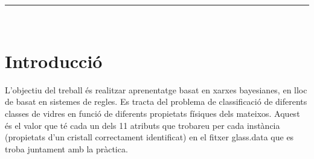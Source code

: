 \documentclass[11pt,a4paper]{article}
\begin{document}
\begin{titlepage}
\begin{center}
\vspace*{0.2in}
\begin{center}
\rule{120mm}{0.1mm}\\
\end{center}
\end{center}
\vspace*{0.2in}
\part*{Introducció}
L'objectiu del treball és realitzar aprenentatge basat en xarxes bayesianes, en lloc de basat en sistemes
de regles. Es tracta del problema de classificació de diferents classes de vidres en funció de diferents
propietats físiques dels mateixos. Aquest és el valor que té cada un dels 11 atributs que trobareu
per cada instància (propietats d'un cristall correctament identificat) en el fitxer glass.data que es troba juntament amb la pràctica.
\end{titlepage}

\renewcommand{\headrulewidth}{0.5pt}
\renewcommand{\footrulewidth}{0.5pt}
\fancypagestyle{plain}{
\fancyhead[L]{}
\fancyhead[C]{}
\fancyhead[R]{\thepage}
\fancyfoot[L]{}
\fancyfoot[C]{}
\fancyfoot[R]{}
\renewcommand{\headrulewidth}{0pt}
\renewcommand{\footrulewidth}{0pt}
}
\pagestyle{fancy}
\vspace*{0.05in}

\tableofcontents
\end{document}
